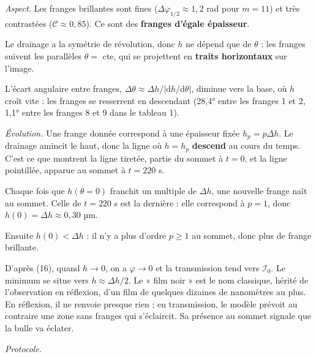 \documentclass[11pt,a4paper]{article}
\begin{document}
\emph{Aspect.} Les franges brillantes sont fines (\(\Delta\varphi_{1/2}\approx1{,}2\) rad pour \(m=11\)) et très contrastées (\(\mathcal C\approx0{,}85\)). Ce sont des \textbf{franges d'égale épaisseur}.

Le drainage a la symétrie de révolution, donc \(h\) ne dépend que de \(\theta\) : les franges suivent les parallèles \(\theta=\) cte, qui se projettent en \textbf{traits horizontaux} sur l'image.

L'écart angulaire entre franges, \(\Delta\theta\approx\Delta h/|\mathrm dh/\mathrm d\theta|\), diminue vers la base, où \(h\) croît vite : les franges se resserrent en descendant (28,4° entre les franges 1 et 2, 1,1° entre les franges 8 et 9 dans le tableau 1).

\emph{Évolution.} Une frange donnée correspond à une épaisseur fixée \(h_p=p\Delta h\). Le drainage amincit le haut, donc la ligne où \(h=h_p\) \textbf{descend} au cours du temps. C'est ce que montrent la ligne tiretée, partie du sommet à \(t=0\), et la ligne pointillée, apparue au sommet à \(t=220\) s.

Chaque fois que \(h(\theta=0)\) franchit un multiple de \(\Delta h\), une nouvelle frange naît au sommet. Celle de \(t=220\) s est la dernière : elle correspond à \(p=1\), donc \(h(0)=\Delta h\approx0{,}30\) µm.

Ensuite \(h(0)<\Delta h\) : il n'y a plus d'ordre \(p\ge1\) au sommet, donc plus de frange brillante.

D'après (16), quand \(h\to0\), on a \(\varphi\to0\) et la transmission tend vers \(\mathcal I_0\). Le minimum se situe vers \(h\approx\Delta h/2\). Le « film noir » est le nom classique, hérité de l'observation en réflexion, d'un film de quelques dizaines de nanomètres au plus. En réflexion, il ne renvoie presque rien ; en transmission, le modèle prévoit au contraire une zone sans franges qui s'éclaircit. Sa présence au sommet signale que la bulle va éclater.

\emph{Protocole.}
\end{document}
